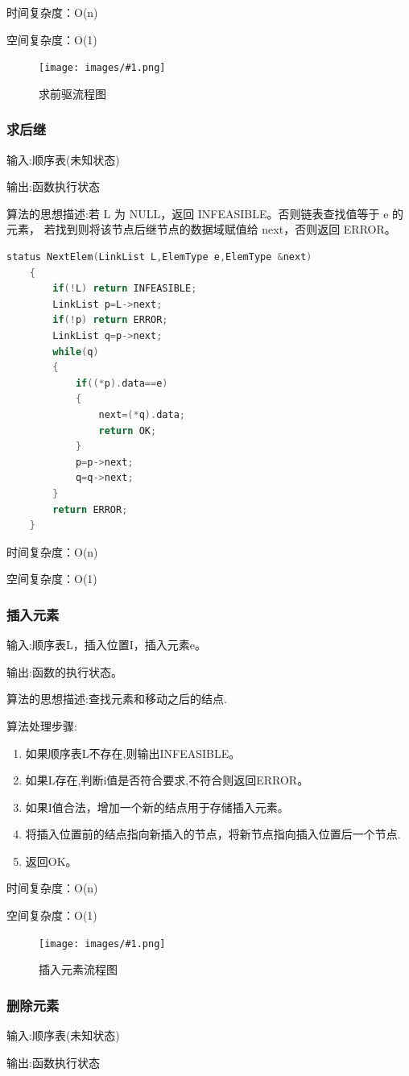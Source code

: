 \documentclass[supercite]{Experimental_Report}
\newcommand{\cfig}[3]{
	\begin{figure}[htb]
		\centering
		\texttt{[image: images/\#1.png]}
		\caption{#3}
		\label{fig:#1}
	\end{figure}
}
\theoremstyle{definition}
\begin{document}
时间复杂度：O(n)

空间复杂度：O(1)
\cfig{1.2.5}{0.8}{求前驱流程图}
\subsubsection{求后继}
输入:顺序表(未知状态)

输出:函数执行状态

算法的思想描述:若 L 为 NULL，返回 INFEASIBLE。否则链表查找值等于 e 的元素，
若找到则将该节点后继节点的数据域赋值给 next，否则返回 ERROR。	
\begin{lstlisting}[language=C] 
	status NextElem(LinkList L,ElemType e,ElemType &next)
	{
		if(!L) return INFEASIBLE;
		LinkList p=L->next;
		if(!p) return ERROR;
		LinkList q=p->next;
		while(q)
		{  
			if((*p).data==e) 
			{
				next=(*q).data;
				return OK;
			}
			p=p->next;
			q=q->next;
		}
		return ERROR;
	}
\end{lstlisting}

时间复杂度：O(n)

空间复杂度：O(1)
\subsubsection{插入元素}

输入:顺序表L，插入位置I，插入元素e。

输出:函数的执行状态。

算法的思想描述:查找元素和移动之后的结点.

算法处理步骤:
\begin{enumerate}
	\renewcommand{\labelenumi}{\theenumi)}
	\item 如果顺序表L不存在,则输出INFEASIBLE。
	\item 如果L存在,判断i值是否符合要求,不符合则返回ERROR。
	\item 如果I值合法，增加一个新的结点用于存储插入元素。
	\item 将插入位置前的结点指向新插入的节点，将新节点指向插入位置后一个节点.
	\item 返回OK。
\end{enumerate}

时间复杂度：O(n)

空间复杂度：O(1)
\cfig{1.2.6}{0.8}{插入元素流程图}
\subsubsection{删除元素}
输入:顺序表(未知状态)

输出:函数执行状态
\end{document}
